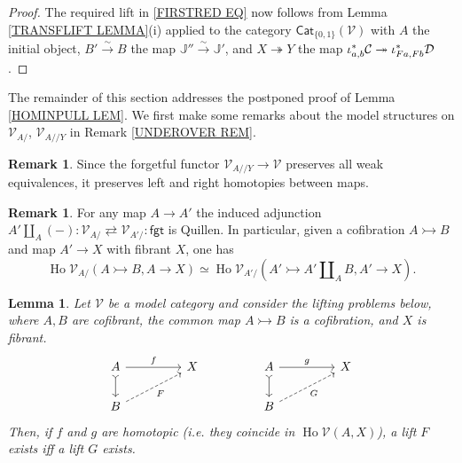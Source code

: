 \documentclass[a4paper,10pt
 ,final
]{article}%
\numberwithin{equation}{section}
\numberwithin{figure}{section}
\newtheorem{lemma}[equation]{Lemma}%
\theoremstyle{definition} %
\newtheorem{remark}[equation]{Remark}%
\DeclareMathOperator{\Ho}{Ho}
\newcommand{\V}{\ensuremath{\mathcal V}}
\newcommand{\1}{\ensuremath{\mathbbm 1}}%
\begin{document}
\begin{proof}
	The required lift in \eqref{FIRSTRED EQ} now follows from 
	Lemma \ref{TRANSFLIFT LEMMA}(i)
	applied to the category
	$\mathsf{Cat}_{\{0,1\}}(\V)$
	with $A$ the initial object,
	$B' \xrightarrow{\sim} B$ the map
	$\mathbb{J}'' \xrightarrow{\sim} \mathbb{J}'$,
	and $X \twoheadrightarrow Y$
	the map 
	$\iota^{\**}_{a,b} \mathcal{C}
	\twoheadrightarrow
	\iota^{\**}_{Fa,Fb} \mathcal{D}$.
\end{proof}



The remainder of this section addresses the postponed proof of
Lemma \ref{HOMINPULL LEM}.
We first make some remarks about 
the model structures
on $\V_{A/}$, $\V_{A//Y}$ in Remark \ref{UNDEROVER REM}.



\begin{remark}\label{UNDFGT REM}
	Since the forgetful functor $\V_{A//Y} \to \V$
	preserves all weak equivalences, 
	it preserves left and right homotopies \cite[\S 4.1,\S 4.12]{DS95} between maps.
\end{remark}


\begin{remark} \label{LEFTQUILUND REM}
	For any map $A \to A'$ the induced adjunction
	$A' \amalg_A (-) \colon \V_{A/} 
	\rightleftarrows 
	\V_{A'/} \colon \mathsf{fgt}$
	is Quillen.
	In particular,
	given a cofibration 
	$A \rightarrowtail B$
	and map $A' \to X$ with fibrant $X$, one has
	\[
	\Ho \V_{A/}\left(A \rightarrowtail B, A \to X\right)
	\simeq
	\Ho \V_{A'/}\left(A' \rightarrowtail A' \amalg_A B, A' \to X\right).
	\]
\end{remark}



\begin{lemma}\label{LIFTEQUIV LEM}
	Let $\V$ be a model category and
	consider the lifting problems below, where $A,B$ are cofibrant, 
	the common map $A \rightarrowtail B$ is a cofibration, and $X$ is fibrant.
	\begin{equation}
	\begin{tikzcd}[column sep = 45pt]
	A
	\ar[rightarrowtail]{d}
	\arrow{r}{f}
	&
	X
	&%
	A
	\ar[rightarrowtail]{d}
	\arrow{r}{g}
	&
	X
	\\
	B \ar[dashed]{ru}[swap]{F}
	&
	&%
	B \ar[dashed]{ru}[swap]{G}
	&
	\end{tikzcd}
	\end{equation}
	Then, if $f$ and $g$ are homotopic 
	(i.e. they coincide in $\Ho \V(A,X)$),
	a lift $F$ exists iff a lift $G$ exists.
\end{lemma}
\end{document}
